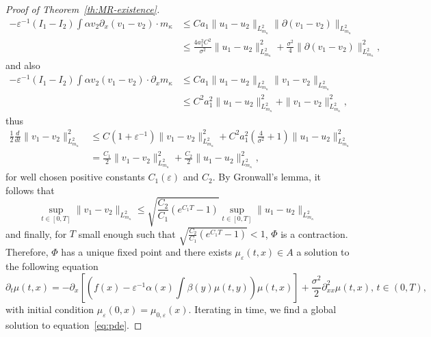 \documentclass[onefignum,onetabnum]{siamart190516}
\newcommand{\1}{\mathbbm{1}}
\newcommand{\eps}{\varepsilon}
\begin{document}
\begin{proof}[Proof of Theorem~\ref{th:MR-existence}]
\begin{align*}
-\eps^{-1}(I_1-I_2)\int \alpha v_2\partial_x(v_1-v_2)\cdot {m_\kappa} &\leq  Ca_1\|u_1-u_2\|_{L_{m_\kappa}^2}\|\partial(v_1-v_2)\|_{L_{m_\kappa}^2}
\\&\leq \frac{4a_1^2C^2}{\sigma^2}\|u_1-u_2\|_{L_{m_\kappa}^2}^2+\frac{\sigma^2}{4}\|\partial(v_1-v_2)\|_{L_{m_\kappa}^2}^2,
\end{align*}
and also
\begin{align*}
-\eps^{-1}(I_1-I_2)\int \alpha v_2(v_1-v_2)\cdot \partial_x{m_\kappa} &\leq  Ca_1\|u_1-u_2\|_{L_{m_\kappa}^2}\|v_1-v_2\|_{L_{m_\kappa}^2}
\\&\leq C^2a_1^2\|u_1-u_2\|_{L_{m_\kappa}^2}^2+\|v_1-v_2\|_{L_{m_\kappa}^2}^2,
\end{align*}
thus
\begin{align*}
\frac12\frac{d}{dt}\|v_1-v_2\|^2_{L_{m_\kappa}^2}&\leq C(1+\eps^{-1})\|v_1-v_2\|_{L_{m_\kappa}^2}^2+C^2a_1^2\left(\frac{4}{\sigma^2}+1\right)\|u_1-u_2\|_{L_{m_\kappa}^2}^2
\\
&= \frac{C_1}2\|v_1-v_2\|_{L_{m_\kappa}^2}^2+\frac{C_2}2\|u_1-u_2\|_{L_{m_\kappa}^2}^2,
\end{align*} 
for well chosen positive constants $C_1(\eps)$ and $C_2$. By Gronwall's lemma, it follows that
$$
\sup_{t\in[0,T]}\|v_1-v_2\|_{L_{m_\kappa}^2}\leq \sqrt{\frac{C_2}{C_1}(e^{C_1T}-1)}\sup_{t\in[0,T]}\|u_1-u_2\|_{L_{m_\kappa}^2}
$$
and finally, for $T$ small enough such that $\sqrt{\frac{C_2}{C_1}\left(e^{C_1T}-1\right)}<1$, $\Phi$ is a contraction. Therefore, $\Phi$ has a unique fixed point and there exists $\mu_\eps(t,x)\in A$ a solution to the following equation
$$
\partial_t\mu(t,x) = -\partial_x\left[\left(f(x)-\eps^{-1}\alpha(x) \int \beta(y)\mu(t,y)\right)\mu(t,x)\right]+\frac{\sigma^2}{2}\partial^2_{xx}\mu(t,x),\,t\in(0,T),
$$
with initial condition $\mu_\eps(0,x)=\mu_{0,\eps}(x)$. Iterating in time, we find a global solution to equation~\eqref{eq:pde}. 
\end{proof}
\end{document}
